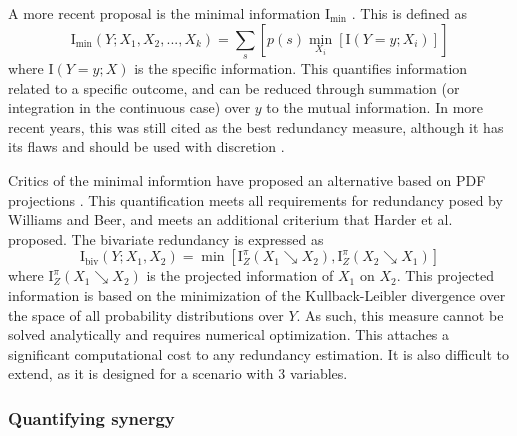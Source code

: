 \documentclass[../main.tex]{subfiles}
\begin{document}
A more recent proposal is the minimal information $\mathrm{I}_\mathrm{min}$ \cite{williams2010nonnegative}.
This is defined as
%
\begin{equation}
\mathrm{I}_\mathrm{min}(Y;{X_1, X_2,...,X_k}) = \sum_s [p(s) \min_{X_i} [\mathrm{I}(Y=y;X_i)]]
\end{equation}
%
where $\mathrm{I}(Y = y;X)$ is the specific information.
This quantifies information related to a specific outcome, and can be reduced through summation (or integration in the continuous case) over $y$ to the mutual information.
In more recent years, this was still cited as the best redundancy measure, although it has its flaws and should be used with discretion \cite{lizier2013towards, olbrich2015information}.

Critics of the minimal informtion have proposed an alternative based on PDF projections \cite{harder2013bivariate}.
This quantification meets all requirements for redundancy posed by Williams and Beer, and meets an additional criterium that Harder et al. proposed.
The bivariate redundancy is expressed as
%
\begin{equation}
\mathrm{I}_\mathrm{biv}(Y;{X_1, X_2}) = \min [\mathrm{I}_Z^\pi (X_1 \searrow X_2), \mathrm{I}_Z^\pi (X_2 \searrow X_1)] 
\end{equation}
%
where $\mathrm{I}_Z^\pi (X_1 \searrow X_2)$ is the projected information of $X_1$ on $X_2$.
This projected information is based on the minimization of the Kullback-Leibler divergence over the space of all probability distributions over $Y$.
As such, this measure cannot be solved analytically and requires numerical optimization.
This attaches a significant computational cost to any redundancy estimation.
It is also difficult to extend, as it is designed for a scenario with 3 variables. %

\subsubsection{Quantifying synergy}
\end{document}
